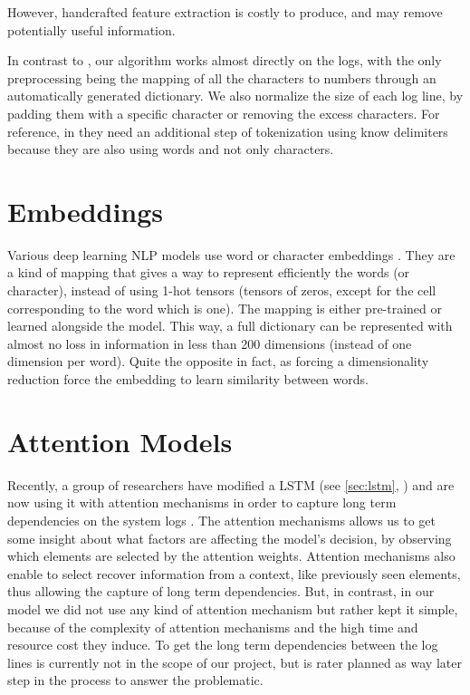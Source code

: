 However, handcrafted feature extraction is costly to produce, and may remove potentially useful information.

In contrast to \cite{lstm_cluster}, our algorithm works almost directly on the logs, with the only preprocessing being the mapping of all the characters to numbers through an automatically generated dictionary.
We also normalize the size of each log line, by padding them with a specific character or removing the excess characters.
For reference, in \cite{rnn_attention_lanl} they need an additional step of tokenization using know delimiters because they are also using words and not only characters.

\section{Embeddings}
Various deep learning NLP models use word or character embeddings \cite{pooling_simple,deep_learning_book}. They are a kind of mapping that gives a way to represent efficiently the words (or character), instead of using 1-hot tensors (tensors of zeros, except for the cell corresponding to the word which is one). The mapping is either pre-trained or learned alongside the model. This way, a full dictionary can be represented with almost no loss in information in less than 200 dimensions (instead of one dimension per word). Quite the opposite in fact, as forcing a dimensionality reduction force the embedding to learn similarity between words.

\section{Attention Models}
Recently, a group of researchers have modified a LSTM (see \autoref{sec:lstm}, ) and are now using it with attention mechanisms in order to capture long term dependencies on the system logs \cite{rnn_attention_lanl}.
The attention mechanisms allows us to get some insight about what factors are affecting the model’s decision, by observing which elements are selected by the attention weights. Attention mechanisms also enable to select recover information from a context, like previously seen elements, thus allowing the capture of long term dependencies.
But, in contrast, in our model we did not use any kind of attention mechanism but rather kept it simple, because of the complexity of attention mechanisms and the high time and resource cost they induce. To get the long term dependencies between the log lines is currently not in the scope of our project, but is rater planned as way later step in the process to answer the problematic.

